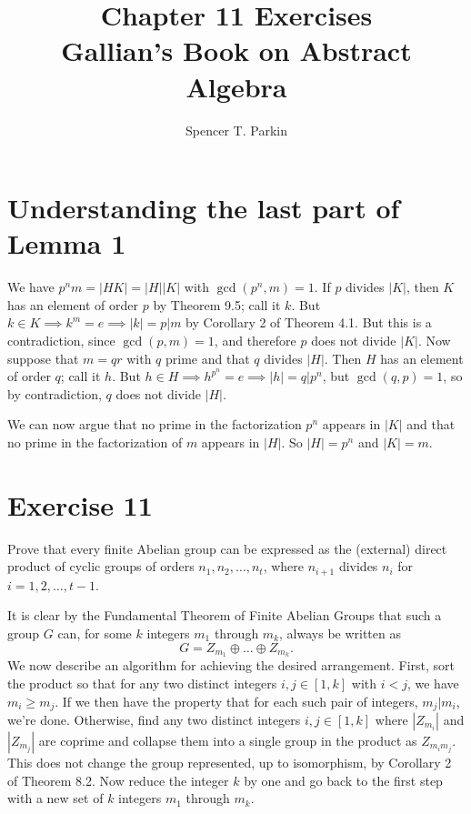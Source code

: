 \documentclass[12pt]{article}
\title{Chapter 11 Exercises\\Gallian's Book on Abstract Algebra}
\author{Spencer T. Parkin}
\begin{document}
\maketitle

\section*{Understanding the last part of Lemma 1}

We have $p^nm=|HK|=|H||K|$ with $\gcd(p^n,m)=1$.
If $p$ divides $|K|$, then $K$ has an element of order $p$
by Theorem 9.5; call it $k$.  But $k\in K\implies k^m=e\implies |k|=p|m$
by Corollary 2 of Theorem 4.1.  But this is a contradiction, since $\gcd(p,m)=1$,
and therefore $p$ does not divide $|K|$.  Now suppose that $m=qr$ with $q$ prime
and that $q$ divides $|H|$.
Then $H$ has an element of order $q$; call it $h$.  But $h\in H\implies h^{p^n}=e\implies |h|=q|p^n$,
but $\gcd(q,p)=1$, so by contradiction, $q$ does not divide $|H|$.

We can now argue that no prime in the factorization $p^n$ appears in $|K|$ and
that no prime in the factorization of $m$ appears in $|H|$.  So $|H|=p^n$ and $|K|=m$.

\section*{Exercise 11}

Prove that every finite Abelian group can be expressed as the
(external) direct product of cyclic groups of orders $n_1,n_2,\dots,n_t$, where $n_{i+1}$
divides $n_i$ for $i=1,2,\dots,t-1$.

It is clear by the Fundamental Theorem of Finite Abelian Groups that such
a group $G$ can, for some $k$ integers $m_1$ through $m_k$, always be written as
\begin{equation*}
G=Z_{m_1}\oplus\dots\oplus Z_{m_k}.
\end{equation*}
We now describe an algorithm for achieving the desired arrangement.
First, sort the product so that for any two distinct integers $i,j\in[1,k]$
with $i<j$, we have $m_i\geq m_j$.  If we then have the property
that for each such pair of integers, $m_j|m_i$, we're done.
Otherwise, find any two distinct integers $i,j\in[1,k]$ where $|Z_{m_i}|$
and $|Z_{m_j}|$ are coprime and collapse them into a single
group in the product as $Z_{m_im_j}$.  This does not change the
group represented, up to isomorphism, by Corollary 2 of Theorem 8.2.
Now reduce the integer $k$ by one and go back to the first step with
a new set of $k$ integers $m_1$ through $m_k$.
\end{document}
